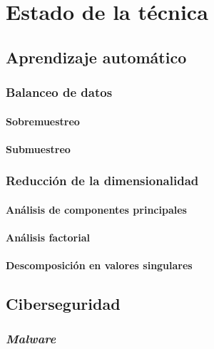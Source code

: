 \chapter{Estado de la técnica}
\label{ch:estado_tecnica}

\section{Aprendizaje automático}
\label{sec:aprend_auto}

\subsection{Balanceo de datos}
\label{subsec:balanceo}

\subsubsection{Sobremuestreo}
\label{subsubsec:oversampling}

\subsubsection{Submuestreo}
\label{subsubsec:undersampling}

\subsection{Reducción de la dimensionalidad}
\label{subsec:red_dim}

\subsubsection{Análisis de componentes principales}
\label{subsubsec:pca}

\subsubsection{Análisis factorial}
\label{subsubsec:fa}

\subsubsection{Descomposición en valores singulares}
\label{subsubsec:svd}

\section{Ciberseguridad}
\label{sec:ciberseguridad}

\subsection{\textit{Malware}}
\label{subsec:malware}



